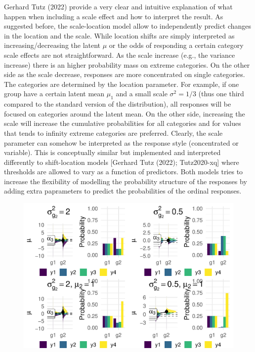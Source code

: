 \documentclass[
  man,floatsintext]{apa6}
\begin{document}
Gerhard Tutz (2022) provide a very clear and intuitive explanation of what happen when including a scale effect and how to interpret the result. As suggested before, the scale-location model allow to independently predict changes in the location and the scale. While location shifts are simply interpreted as increasing/decreasing the latent \(\mu\) or the odds of responding a certain category scale effects are not straightforward. As the scale increase (e.g., the variance increase) there is an higher probability mass on extreme categories. On the other side as the scale decrease, responses are more concentrated on single categories. The categories are determined by the location parameter. For example, if one group have a certain latent mean \(\mu_1\) and a small scale \(\sigma^2 = 1/3\) (thus one third compared to the standard version of the distribution), all responses will be focused on categories around the latent mean. On the other side, increasing the scale will increase the cumulative probabilities for all categories and for values that tends to infinity extreme categories are preferred. Clearly, the scale parameter can somehow be interpreted as the response style (concentrated or variable). This is conceptually similar but implemented and interpreted differently to shift-location models {[}Gerhard Tutz (2022); Tutz2020-xq{]} where thresholds are allowed to vary as a function of predictors. Both models tries to increase the flexibility of modelling the probability structure of the responses by adding extra paprameters to predict the probabilities of the ordinal responses.

\scriptsize

\begin{figure}

{\centering \includegraphics{paper-new_files/figure-latex/unnamed-chunk-19-1} 

}

\caption{ }\label{fig:unnamed-chunk-19}
\end{figure}
\end{document}

